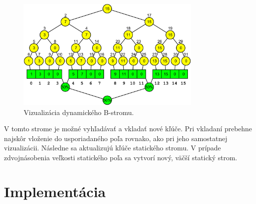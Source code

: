 \begin{figure}
    \centering
    \includegraphics[width=0.8\textwidth]{figures/screenshots/cobtree_overview.pdf}
    \caption{Vizualizácia dynamického \obliv B-stromu.}
    \label{fig:ss_cobtree}
\end{figure}

V tomto strome je možné vyhľadávať a vkladať nové kľúče. Pri vkladaní prebehne najskôr vloženie do usporiadaného poľa rovnako, ako pri jeho samostatnej vizualizácii. Následne sa aktualizujú kľúče statického stromu. V prípade zdvojnásobenia veľkosti statického poľa sa vytvorí nový, väčší statický strom.


\section{Implementácia}

